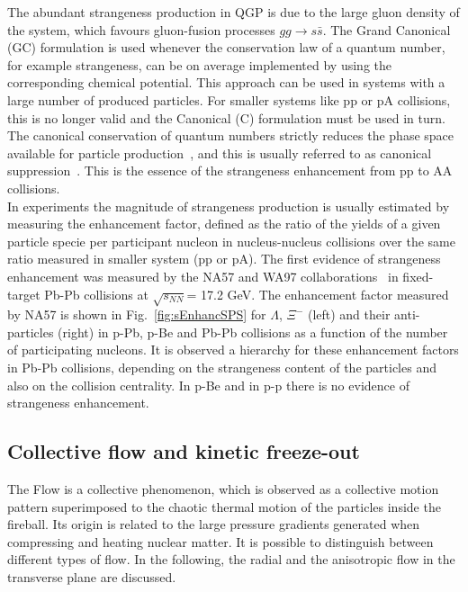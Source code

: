 The abundant strangeness production in QGP is due to the large gluon 
density of the system, which favours gluon-fusion processes
$gg \rightarrow s\bar{s}$. 
The Grand Canonical (GC) formulation is used whenever the conservation law of
a quantum number, for example strangeness, can be on average implemented by using
the corresponding chemical potential. This approach can be used in systems 
with a large number of produced particles. For smaller systems like pp or pA
collisions, this is no longer valid and the Canonical (C) formulation must be used
in turn. The canonical conservation of quantum numbers strictly reduces the phase
space available for particle production~\cite{Beutler:2009cc}, and this is usually referred to as canonical suppression~\cite{Tounsi:2001ck}.
This is the essence of the strangeness enhancement from pp to AA collisions.\\
In experiments the magnitude of strangeness production is usually estimated by measuring 
the enhancement factor, defined as the ratio of the yields of a given particle 
specie per participant nucleon in nucleus-nucleus collisions over the same 
ratio measured in smaller system (pp or pA). The first evidence of 
strangeness enhancement was measured by the NA57 and WA97 
collaborations~\cite{Sandor:2004bg} in fixed-target Pb-Pb collisions at 
$\sqrt{s_{NN}}$= 17.2 GeV. The enhancement factor measured by NA57 
is shown in Fig.~\ref{fig:sEnhancSPS} for $\Lambda$, $\Xi^-$ (left) and 
their anti-particles (right) in p-Pb, p-Be and Pb-Pb collisions as a function 
of the number of participating nucleons. It is observed a hierarchy for these 
enhancement factors in Pb-Pb collisions, depending on the strangeness
 content of the particles and also on the collision centrality. In p-Be and in 
 p-p there is no evidence of strangeness enhancement. 

\subsection{Collective flow and kinetic freeze-out}
The Flow is a collective phenomenon, which is observed as a collective 
motion pattern superimposed to the chaotic thermal motion of the 
particles inside the fireball. Its origin is related to the large pressure gradients 
generated when compressing and heating nuclear matter. It is possible 
to distinguish between different types of flow. In the following, 
the radial and the anisotropic flow in the transverse plane are discussed. 

